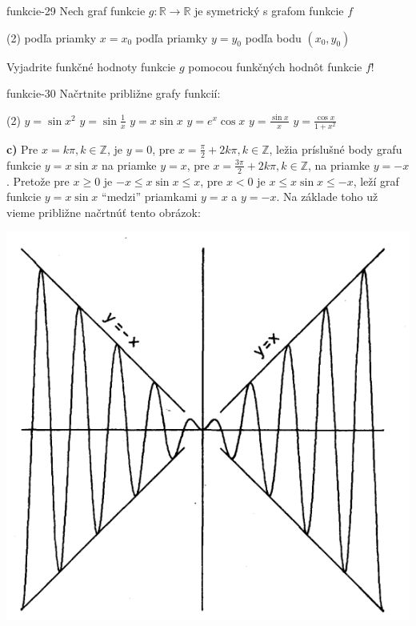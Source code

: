 \begin{defproblem}{funkcie-29}
Nech graf funkcie $g:\mathbb{R}\rightarrow\mathbb{R}$ je symetrický s grafom funkcie $f$
\begin{tasks}(2)
  \task podľa priamky $x=x_0$
  \task podľa priamky $y=y_0$
  \task podľa bodu $(x_0,y_0)$
\end{tasks}
Vyjadrite funkčné hodnoty funkcie $g$ pomocou funkčných hodnôt funkcie $f$!
\end{defproblem}

\begin{defproblem}{funkcie-30}
Načrtnite približne grafy funkcií:
\begin{tasks}(2)
  \task $y=\sin x^2$
  \task $y=\sin \frac{1}{x}$
  \task $y=x\sin x$
  \task $y=e^x\cos x$
  \task $y=\frac{\sin x}{x}$
  \task $y=\frac{\cos x}{1+x^2}$
\end{tasks}

\begin{solution}
  \textbf{c)}
  Pre $x = k \pi, k \in \mathbb{Z}$, je $y = 0$, pre $x = \frac{\pi}{2} +
  2k\pi,k\in\mathbb{Z}$, ležia príslušné body grafu funkcie $y= x \sin{x}$ na
  priamke $y = x$, pre $x = \frac{3\pi}{2} + 2k\pi, k\in\mathbb{Z}$, na priamke
  $y = -x$. Pretože pre $x \geq 0$ je $-x \leq x \sin{x} \leq x$, pre $x < 0$ je
  $x\leq x\sin x\leq -x$, leží graf funkcie $y = x\sin x$ ``medzi'' priamkami $y
  = x$ a $y = -x$. Na základe toho už vieme približne načrtnúť tento obrázok:
  \begin{center}
\includegraphics[scale=0.5]{img/pr. 30.png}
\end{center}
\end{solution}
\end{defproblem}


